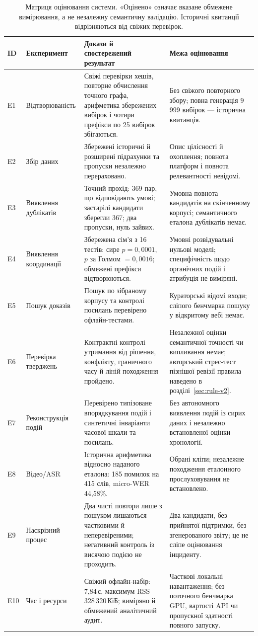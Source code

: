 \begin{table}[!htbp]
\centering
\small
\caption{Матриця оцінювання системи. «Оцінено» означає вказане обмежене вимірювання, а не незалежну семантичну валідацію. Історичні квитанції відрізняються від свіжих перевірок.}
\label{tab:evaluation}
\begin{tabularx}{\textwidth}{@{}p{}p{}XX@{}}
\toprule
ID & Експеримент & Докази й спостережений результат & Межа оцінювання \\
\midrule
E1 & Відтворюваність & Свіжі перевірки хешів, повторне обчислення точного графа, арифметика збережених вибірок і чотири префікси по 25 вибірок збігаються. & Без свіжого повторного збору; повна генерація 9\,999 вибірок --- історична квитанція. \\
E2 & Збір даних & Збережені історичні й розширені підрахунки та пропуски незалежно перераховано. & Опис цілісності й охоплення; повнота платформ і повнота релевантності невідомі. \\
E3 & Виявлення дублікатів & Точний прохід: 369 пар, що відповідають умові; застарілі кандидати зберегли 367; два пропуски, нуль зайвих. & Умовна повнота кандидатів на скінченному корпусі; семантичного еталона дублікатів немає. \\
E4 & Виявлення координації & Збережена сім'я з 16 тестів: сире $p=0{,}0001$, $p$ за Голмом $=0{,}0016$; обмежені префікси відтворюються. & Умовні розвідувальні нульові моделі; специфічність щодо органічних подій і атрибуція не виміряні. \\
E5 & Пошук доказів & Пошук по зібраному корпусу та контролі посилань перевірено офлайн-тестами. & Кураторські відомі входи; сліпого бенчмарка пошуку у відкритому вебі немає. \\
E6 & Перевірка тверджень & Контрактні контролі утримання від рішення, конфлікту, граничного часу й ліній походження пройдено. & Незалежної оцінки семантичної точності чи випливання немає; авторський стрес-тест пізнішої ревізії правила наведено в розділі~\ref{sec:rule-v2}. \\
E7 & Реконструкція подій & Перевірено типізоване впорядкування подій і синтетичні інваріанти часової шкали та посилань. & Без автономного виявлення подій із сирих даних і незалежно встановленої оцінки хронології. \\
E8 & Відео/ASR & Історична арифметика відносно наданого еталона: 185 помилок на 415 слів, micro-WER 44,58\%. & Обрані кліпи; незалежне походження еталонного прослуховування не встановлено. \\
E9 & Наскрізний процес & Два чисті повтори лише з пошуком лишаються частковими й неперевіреними; негативний контроль із висячою подією не проходить. & Два кандидати, без прийнятої підтримки, без згенерованого звіту; це не сліпе оцінювання інциденту. \\
E10 & Час і ресурси & Свіжий офлайн-набір: 7,84\,с, максимум RSS 328\,320\,КіБ; виміряно й обмежений аналітичний аудит. & Часткові локальні навантаження; без поточного бенчмарка GPU, вартості API чи пропускної здатності повного запуску. \\
\bottomrule
\end{tabularx}
\end{table}

